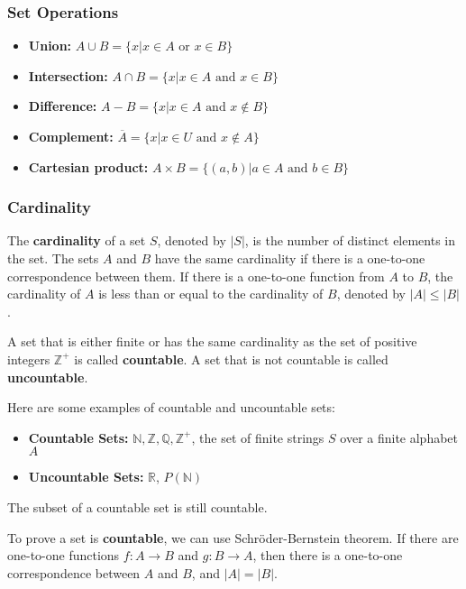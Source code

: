 \documentclass[a4paper,12pt]{article}
\begin{document}
\subsubsection{Set Operations}

\begin{itemize}
	\item \textbf{Union:} $A \cup B = \{x | x \in A \text{ or } x \in B\}$
	\item \textbf{Intersection:} $A \cap B = \{x | x \in A \text{ and } x \in B\}$
	\item \textbf{Difference:} $A - B = \{x | x \in A \text{ and } x \notin B\}$
	\item \textbf{Complement:} $\overline{A} = \{x | x \in U \text{ and } x \notin A\}$
	\item \textbf{Cartesian product:} $A \times B = \{(a,b) | a \in A \text{ and } b \in B\}$
\end{itemize}

\subsubsection{Cardinality}

The \textbf{cardinality} of a set $S$, denoted by $|S|$, is the number of distinct elements in the set.
The sets $A$ and $B$ have the same cardinality if there is a one-to-one correspondence between them.
If there is a one-to-one function from $A$ to $B$, the cardinality of $A$ is less than or equal to the cardinality of $B$, denoted by $|A| \leq |B|$.

A set that is either finite or has the same cardinality as the set of positive integers $\mathbb{Z^+}$ is called \textbf{countable}.
A set that is not countable is called \textbf{uncountable}.

Here are some examples of countable and uncountable sets:

\begin{itemize}
	\item \textbf{Countable Sets:} $\mathbb{N}, \mathbb{Z}, \mathbb{Q}, \mathbb{Z^+}$, the set of finite strings $S$ over a finite alphabet $A$
	\item \textbf{Uncountable Sets:} $\mathbb{R}$, $P(\mathbb{N})$
\end{itemize}

The subset of a countable set is still countable.

To prove a set is \textbf{countable}, we can use Schröder-Bernstein theorem.
If there are one-to-one functions $f: A \rightarrow B$ and $g: B \rightarrow A$, then there is a one-to-one correspondence between $A$ and $B$, and $|A| = |B|$.
\end{document}

